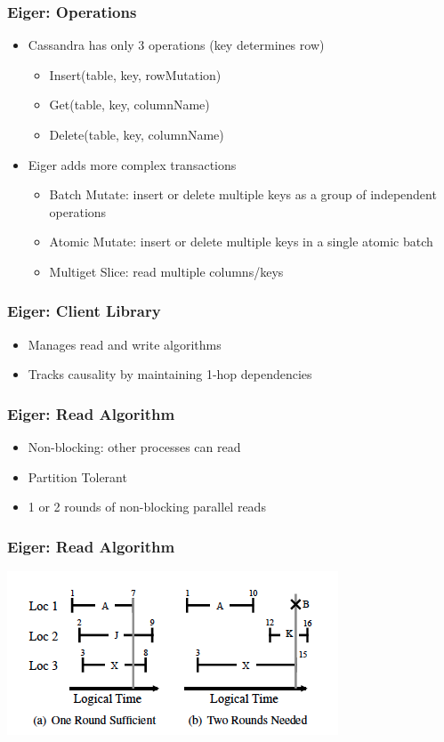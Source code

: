 \documentclass{beamer}
\begin{document}
\begin{frame}
\frametitle{Eiger: Operations}
\begin{itemize}
\pause \item Cassandra has only 3 operations (key determines row)
	\begin{itemize}
		\item Insert(table, key, rowMutation)
		\item Get(table, key, columnName)
		\item Delete(table, key, columnName)
	\end{itemize}
\pause \item Eiger adds more complex transactions
	\begin{itemize}
		\item Batch Mutate: insert or delete multiple keys as a group of independent operations
		\item Atomic Mutate: insert or delete multiple keys in a single atomic batch
		\item Multiget Slice: read multiple columns/keys
	\end{itemize}	
\end{itemize}  
\end{frame}

\begin{frame}
\frametitle{Eiger: Client Library}
\begin{itemize}
\item Manages read and write algorithms
\item Tracks causality by maintaining 1-hop dependencies
\end{itemize}  
\end{frame}


\begin{frame}
\frametitle{Eiger: Read Algorithm}
\begin{itemize}
\item Non-blocking: other processes can read
\item Partition Tolerant
\item 1 or 2 rounds of non-blocking parallel reads
\end{itemize}  
\end{frame}

\begin{frame}
\frametitle{Eiger: Read Algorithm}
\includegraphics[scale=0.80]{Figure_Read.png}
\end{frame}
\end{document}
